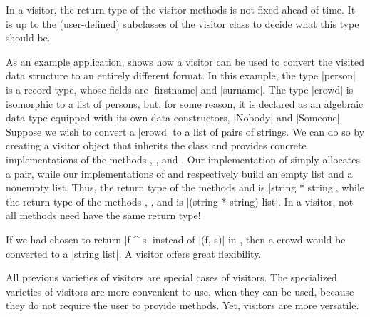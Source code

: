 \documentclass[11pt,a4paper,twoside]{article}
\begin{document}
In a \fold visitor, the return type of the visitor methods is not fixed ahead
of time. It is up to the (user-defined) subclasses of the visitor class to
decide what this type should be.

As an example application,  shows how a \fold visitor can be
used to convert the visited data structure to an entirely different format. In
this example, the type \oc|person| is a record type, whose fields are
\oc|firstname| and \oc|surname|. The type \oc|crowd| is isomorphic to a list
of persons, but, for some reason, it is declared as an algebraic data type
equipped with its own data constructors, \oc|Nobody| and \oc|Someone|. Suppose
we wish to convert a \oc|crowd| to a list of pairs of strings. We can do so by
creating a visitor object that inherits the class \fold and provides concrete
implementations of the methods ,
, and .
Our implementation of  simply allocates
a pair, while our implementations of
 and 
respectively build an empty list and a nonempty list.
Thus, the return type of the methods 
and  is \oc|string * string|,
while the return type of the methods ,
, and  is
\oc|(string * string) list|. In a \fold visitor, not all methods
need have the same return type!

If we had chosen to return \oc|f ^ s| instead of \oc|(f, s)| in
, then a crowd would be converted to
a \oc|string list|. A \fold visitor offers great flexibility.

All previous varieties of visitors are special cases of \fold visitors. The
specialized varieties of visitors are more convenient to use, when they can be
used, because they do not require the user to provide \tyconascendingmethod{}
methods. Yet, \fold visitors are more versatile.

\end{document}
